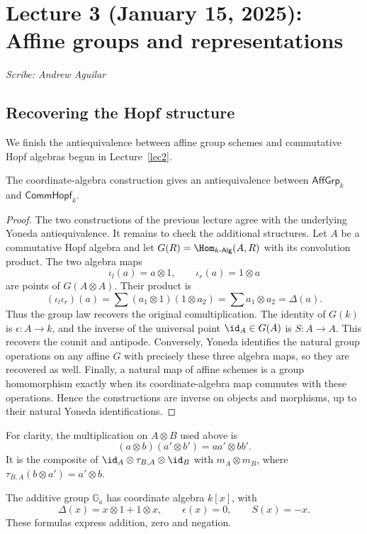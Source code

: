 \section{Lecture 3 (January 15, 2025): Affine groups and representations}\label{lec3}
\noindent\textit{Scribe: Andrew Aguilar}

\subsection{Recovering the Hopf structure}
We finish the antiequivalence between affine group schemes and commutative
Hopf algebras begun in Lecture~\ref{lec2}.

\begin{theorem}
The coordinate-algebra construction gives an antiequivalence between
$\mathsf{AffGrp}_k$ and $\mathsf{CommHopf}_k$.
\end{theorem}
\begin{proof}
The two constructions of the previous lecture agree with the underlying
Yoneda antiequivalence. It remains to check the additional structures.
Let $A$ be a commutative Hopf algebra and let
$G(R)=\Hom_{k\text{-}\mathsf{Alg}}(A,R)$ with its convolution product.
The two algebra maps
\[
 \iota_l(a)=a\otimes1,\qquad \iota_r(a)=1\otimes a
\]
are points of $G(A\otimes A)$. Their product is
\[
 (\iota_l\iota_r)(a)
   =\sum(a_1\otimes1)(1\otimes a_2)
   =\sum a_1\otimes a_2=\Delta(a).
\]
Thus the group law recovers the original comultiplication. The identity
of $G(k)$ is $\epsilon:A\to k$, and the inverse of the universal point
$\id_A\in G(A)$ is $S:A\to A$. This recovers the counit and antipode.
Conversely, Yoneda identifies the natural group operations on any affine
$G$ with precisely these three algebra maps, so they are recovered as well.
Finally, a natural map of affine schemes is a group homomorphism exactly
when its coordinate-algebra map commutes with these operations. Hence the
constructions are inverse on objects and morphisms, up to their natural
Yoneda identifications.
\end{proof}

For clarity, the multiplication on $A\otimes B$ used above is
\[
 (a\otimes b)(a'\otimes b')=aa'\otimes bb'.
\]
It is the composite of $\id_A\otimes\tau_{B,A}\otimes\id_B$ with
$m_A\otimes m_B$, where $\tau_{B,A}(b\otimes a')=a'\otimes b$.

\begin{example}
The additive group $\mathbb G_a$ has coordinate algebra $k[x]$, with
\[
 \Delta(x)=x\otimes1+1\otimes x,\qquad
 \epsilon(x)=0,\qquad S(x)=-x.
\]
These formulas express addition, zero and negation.
\end{example}

